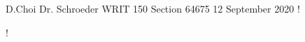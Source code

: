 \documentclass[12pt, letterpaper]{article}
\begin{document}
\begin{mla}
	{D.}{Choi}
	{Dr. Schroeder}
	{WRIT 150 Section 64675}
	{12 September 2020}
	{!}


!

\end{mla}
\end{document}
